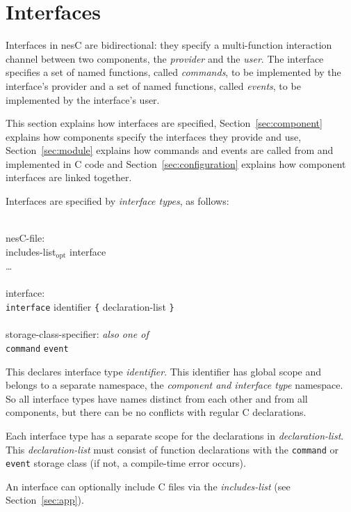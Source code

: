 \documentclass[11pt]{article}
\newcommand{\kw}[1]{{\tt #1}}
\newcommand{\nesc}{nesC\xspace}
\newcommand{\opt}{$_{\mbox{opt}}$\xspace}
\begin{document}
\section{Interfaces}
\label{sec:interface}

Interfaces in \nesc are bidirectional: they specify a multi-function
interaction channel between two components, the \emph{provider} and the
\emph{user}. The interface specifies a set of named functions, called
\emph{commands}, to be implemented by the interface's provider and a set of
named functions, called \emph{events}, to be implemented by the interface's
user.

This section explains how interfaces are specified,
Section~\ref{sec:component} explains how components specify the interfaces
they provide and use, Section~\ref{sec:module} explains how commands and
events are called from and implemented in C code and
Section~\ref{sec:configuration} explains how component interfaces are
linked together.

Interfaces are specified by \emph{interface types}, as follows:
\em \begin{tabbing}
\hspace*{2cm}\= \\ \kill
nesC-file: \\
\>	includes-list\opt interface\\
\>	\ldots\\
\\
interface:\\
\>	\kw{interface} identifier \kw{\{} declaration-list \kw{\}}\\
\\
storage-class-specifier: \emph{also one of}\\
\>	\kw{command} \kw{event}\\
\end{tabbing} \rm
This declares interface type \emph{identifier}. This identifier has global
scope and belongs to a separate namespace, the \emph{component and
interface type} namespace. So all interface types have names distinct from
each other and from all components, but there can be no conflicts with
regular C declarations.

Each interface type has a separate scope for the declarations in
\emph{declaration-list}. This \emph{declaration-list} must consist of
function declarations with the \kw{command} or \kw{event} storage class (if
not, a compile-time error occurs).

An interface can optionally include C files via the \emph{includes-list}
(see Section~\ref{sec:app}).
\end{document}

